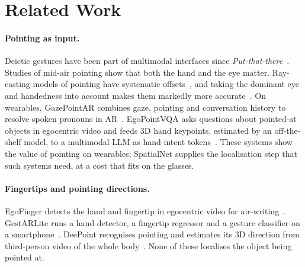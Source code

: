 \section{Related Work}\label{sec:related}

\paragraph{Pointing as input.} Deictic gestures have been part of multimodal interfaces since \emph{Put-that-there}~\cite{bolt1980put}. Studies of mid-air pointing show that both the hand and the eye matter. Ray-casting models of pointing have systematic offsets~\cite{mayer2015modeling}, and taking the dominant eye and handedness into account makes them markedly more accurate~\cite{plaumann2018towards}. On wearables, GazePointAR combines gaze, pointing and conversation history to resolve spoken pronouns in AR~\cite{lee2024gazepointar}. EgoPointVQA asks questions about pointed-at objects in egocentric video and feeds 3D hand keypoints, estimated by an off-the-shelf model, to a multimodal LLM as hand-intent tokens~\cite{choi2026hint}. These systems show the value of pointing on wearables; SpatialNet supplies the localisation step that such systems need, at a cost that fits on the glasses.

\paragraph{Fingertips and pointing directions.} EgoFinger detects the hand and fingertip in egocentric video for air-writing~\cite{huang2016pointing}. GestARLite runs a hand detector, a fingertip regressor and a gesture classifier on a smartphone~\cite{jain2019gestarlite}. DeePoint recognises pointing and estimates its 3D direction from third-person video of the whole body~\cite{nakamura2023deepoint}. None of these localises the object being pointed at.

